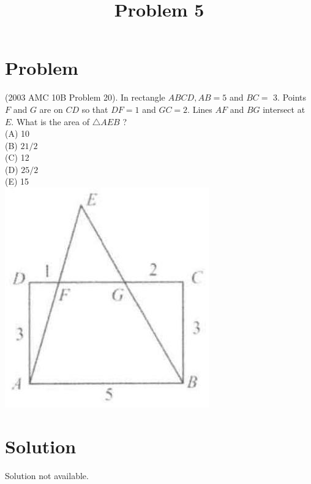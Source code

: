 \documentclass{article}
\title{Problem 5}
\date{}
\begin{document}
\maketitle

\section*{Problem}
(2003 AMC 10B Problem 20). In rectangle \(A B C D, A B=5\) and \(B C=\) 3. Points \(F\) and \(G\) are on \(C D\) so that \(D F=1\) and \(G C=2\). Lines \(A F\) and \(B G\) intersect at \(E\). What is the area of \(\triangle A E B\) ?\\
(A) 10\\
(B) \(21 / 2\)\\
(C) 12\\
(D) \(25 / 2\)\\
(E) 15\\
\centering
\includegraphics[width=\textwidth]{images/088(2).jpg}

\section*{Solution}
Solution not available.
\end{document}
